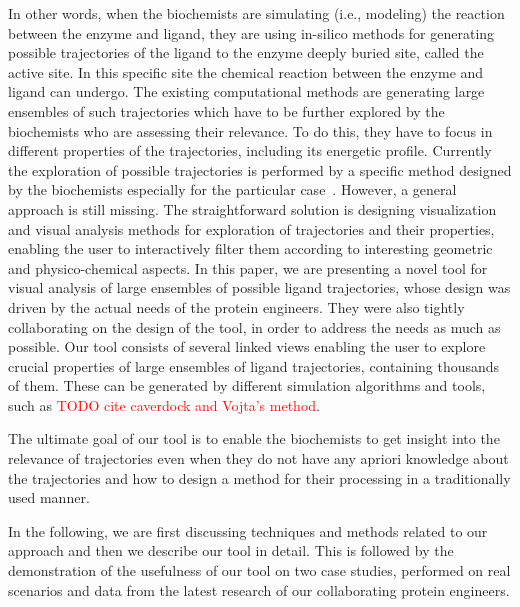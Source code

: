 \documentclass{vgtc}                          %
\begin{document}
In other words, when the biochemists are simulating (i.e., modeling) the reaction between the enzyme and ligand, they are using in-silico methods for generating  possible trajectories of the ligand to the enzyme deeply buried site, called the active site.
In this specific site the chemical reaction between the enzyme and ligand can undergo. 
The existing computational methods are generating large ensembles of such trajectories which have to be further explored by the biochemists who are assessing their relevance.
To do this, they have to focus in different properties of the trajectories, including its energetic profile. 
Currently the exploration of possible trajectories is performed by a specific method designed by the biochemists especially for the particular case~\cite{pmid29858243}.
However, a general approach is still missing.
The straightforward solution is designing visualization and visual analysis methods for exploration of trajectories and their properties, enabling the user to interactively filter them according to interesting geometric and physico-chemical aspects.
In this paper, we are presenting a novel tool for visual analysis of large ensembles of possible ligand trajectories, whose design was driven by the actual needs of the protein engineers.
They were also tightly collaborating on the design of the tool, in order to address the needs as much as possible. 
Our tool consists of several linked views enabling the user to explore crucial properties of large ensembles of ligand trajectories, containing thousands of them. 
These can be generated by different simulation algorithms and tools, such as \textcolor{red}{TODO cite caverdock and Vojta's method}.

The ultimate goal of our tool is to enable the biochemists to get insight into the relevance of trajectories even when they do not have any apriori knowledge about the trajectories and how to design a method for their processing in a traditionally used manner.

In the following, we are first discussing techniques and methods related to our approach and then we describe our tool in detail. 
This is followed by the demonstration of the usefulness of our tool on two case studies, performed on real scenarios and data from the latest research of our collaborating protein engineers.
\end{document}
